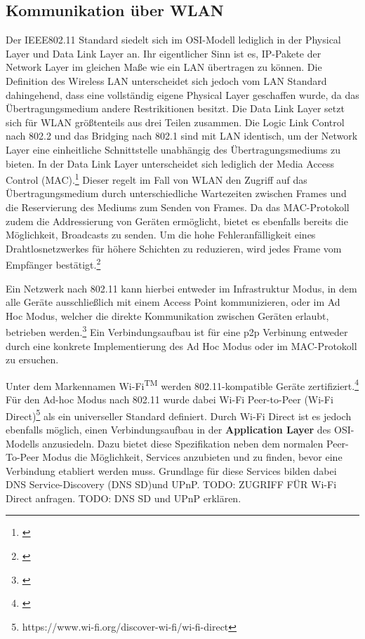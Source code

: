 \documentclass[12pt,a4paper]{article}
\begin{document}
        \subsection{Kommunikation über WLAN}
            Der IEEE802.11 Standard siedelt sich im OSI-Modell lediglich in der Physical Layer und Data Link Layer an. Ihr eigentlicher Sinn ist es,
            IP-Pakete der Network Layer im gleichen Maße wie ein LAN übertragen zu können.
            Die Definition des Wireless LAN unterscheidet sich jedoch vom LAN Standard dahingehend, dass eine vollständig eigene Physical Layer geschaffen wurde,
            da das Übertragungsmedium andere Restrikitionen besitzt. Die Data Link Layer setzt sich für WLAN größtenteils aus drei Teilen zusammen.
            Die Logic Link Control nach 802.2 und das Bridging nach 802.1 sind mit LAN identisch, um der Network Layer eine einheitliche Schnittstelle unabhängig des Übertragungsmediums zu bieten.
            In der Data Link Layer unterscheidet sich lediglich der Media Access Control (MAC).\footnote{\cite[S.311]{Sauter}}
            Dieser regelt im Fall von WLAN den Zugriff auf das Übertragungsmedium durch unterschiedliche Wartezeiten zwischen Frames und die Reservierung des Mediums zum Senden von Frames.
            Da das MAC-Protokoll zudem die Addressierung von Geräten ermöglicht, bietet es ebenfalls bereits die Möglichkeit, Broadcasts zu senden.
            Um die hohe Fehleranfälligkeit eines Drahtlosnetzwerkes für höhere Schichten zu reduzieren, wird jedes Frame vom Empfänger bestätigt.\footnote{\cite[S.325-327]{Sauter}}
            
            Ein Netzwerk nach 802.11 kann hierbei entweder im Infrastruktur Modus, in dem alle Geräte ausschließlich mit einem Access Point kommunizieren,
            oder im Ad Hoc Modus, welcher die direkte Kommunikation zwischen Geräten erlaubt, betrieben werden.\footnote{\cite[S.82]{Sikora}}
            Ein Verbindungsaufbau ist für eine p2p Verbinung entweder durch eine konkrete Implementierung des Ad Hoc Modus oder
            im MAC-Protokoll zu ersuchen.

            Unter dem Markennamen Wi-Fi\textsuperscript{TM} werden 802.11-kompatible Geräte zertifiziert.\footnote{\cite[S.80]{Sikora}}
            Für den Ad-hoc Modus nach 802.11 wurde dabei Wi-Fi Peer-to-Peer (Wi-Fi Direct)\textregistered\footnote{https://www.wi-fi.org/discover-wi-fi/wi-fi-direct} als ein universeller Standard definiert.
            Durch Wi-Fi Direct ist es jedoch ebenfalls möglich, einen Verbindungsaufbau in der {\bf Application Layer} des OSI-Modells anzusiedeln.
            Dazu bietet diese Spezifikation neben dem normalen Peer-To-Peer Modus die Möglichkeit, Services anzubieten und zu finden, bevor eine Verbindung etabliert werden muss.
            Grundlage für diese Services bilden dabei DNS Service-Discovery (DNS SD)und UPnP.
            TODO: ZUGRIFF FÜR Wi-Fi Direct anfragen.
            TODO: DNS SD und UPnP erklären.
\end{document}
